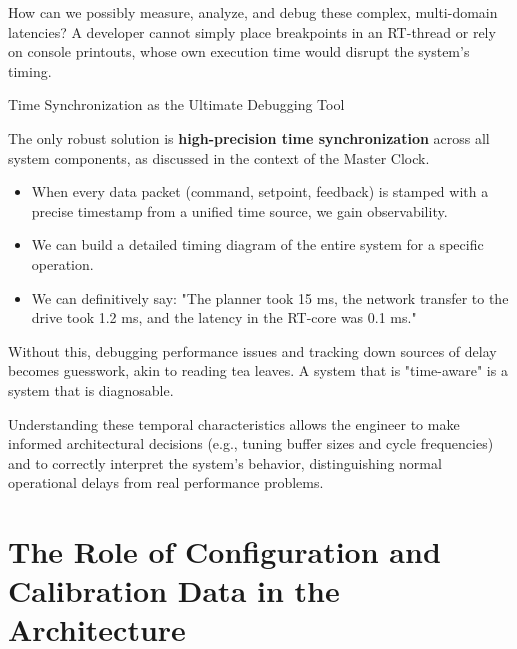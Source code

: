 How can we possibly measure, analyze, and debug these complex, multi-domain latencies? A developer cannot simply place breakpoints in an RT-thread or rely on console printouts, whose own execution time would disrupt the system's timing.

\begin{tipbox}{Time Synchronization as the Ultimate Debugging Tool}
    

    The only robust solution is \textbf{high-precision time synchronization} across all system components, as discussed in the context of the Master Clock.
    \begin{itemize}
        \item When every data packet (command, setpoint, feedback) is stamped with a precise timestamp from a unified time source, we gain observability.
        \item We can build a detailed timing diagram of the entire system for a specific operation.
        \item We can definitively say: "The planner took 15 ms, the network transfer to the drive took 1.2 ms, and the latency in the RT-core was 0.1 ms."
    \end{itemize}
    Without this, debugging performance issues and tracking down sources of delay becomes guesswork, akin to reading tea leaves. A system that is "time-aware" is a system that is diagnosable.
\end{tipbox}
Understanding these temporal characteristics allows the engineer to make informed architectural decisions (e.g., tuning buffer sizes and cycle frequencies) and to correctly interpret the system's behavior, distinguishing normal operational delays from real performance problems.












\section{The Role of Configuration and Calibration Data in the Architecture}
\label{sec:config_data}

